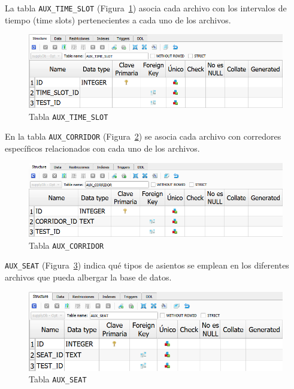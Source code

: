 La tabla \texttt{AUX\_TIME\_SLOT} (Figura~\ref{fig:dbSupplyAUX_TIME_SLOT}) asocia cada archivo con los intervalos de tiempo (time slots) pertenecientes a cada uno de los archivos. 

\begin{figure}[H]
\centering
\includegraphics[width=.9\textwidth]{fig/Tablas base de datos/Oferta/AUX_TIME_SLOT.png}
\caption{Tabla \texttt{AUX\_TIME\_SLOT}}
\label{fig:dbSupplyAUX_TIME_SLOT}
\end{figure}

En la tabla \texttt{AUX\_CORRIDOR} (Figura~\ref{fig:dbSupplyAUX_CORRIDOR}) se asocia cada archivo con corredores específicos relacionados con cada uno de los archivos.

\begin{figure}[H]
\centering
\includegraphics[width=.9\textwidth]{fig/Tablas base de datos/Oferta/AUX_CORRIDOR.png}
\caption{Tabla \texttt{AUX\_CORRIDOR}}
\label{fig:dbSupplyAUX_CORRIDOR}
\end{figure}

\texttt{AUX\_SEAT} (Figura~\ref{fig:dbSupplyAUX_SEAT}) indica qué tipos de asientos se emplean en los diferentes archivos que pueda albergar la base de datos.

\begin{figure}[H]
\centering
\includegraphics[width=.9\textwidth]{fig/Tablas base de datos/Oferta/AUX_SEAT.png}
\caption{Tabla \texttt{AUX\_SEAT}}
\label{fig:dbSupplyAUX_SEAT}
\end{figure}

